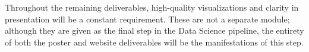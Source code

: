 Throughout the remaining deliverables, high-quality visualizations and clarity in presentation will be a constant requirement. These are not a separate module; although they are given as the final step in the Data Science pipeline, the entirety of both the poster and website deliverables will be the manifestations of this step.

\singlecolumn
\bye

